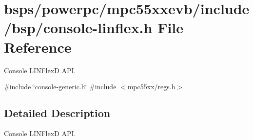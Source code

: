 \hypertarget{console-linflex_8h}{}\section{bsps/powerpc/mpc55xxevb/include/bsp/console-\/linflex.h File Reference}
\label{console-linflex_8h}


Console L\+I\+N\+FlexD A\+PI.  


{\ttfamily \#include \char`\"{}console-\/generic.\+h\char`\"{}}\newline
{\ttfamily \#include $<$mpc55xx/regs.\+h$>$}\newline


\subsection{Detailed Description}
Console L\+I\+N\+FlexD A\+PI. 

